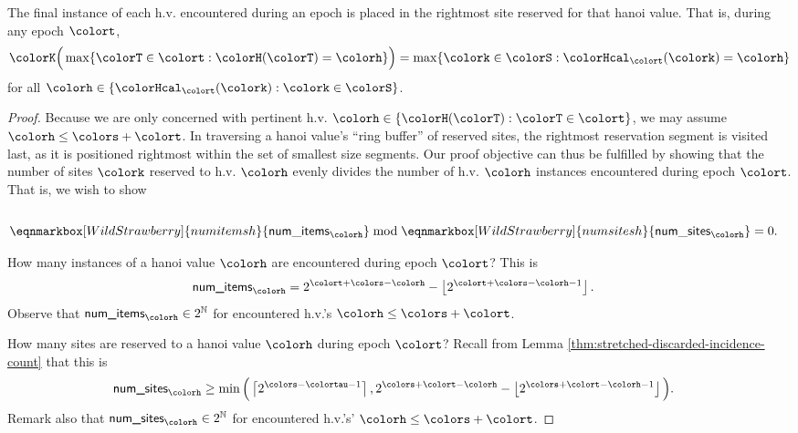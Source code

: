 \begin{lemma}
\label{thm:tilted-last-touched}
The final instance of each h.v. encountered during an epoch is placed in the rightmost site reserved for that hanoi value.
That is, during any epoch $\colort$,
\begin{align*}
\colorK\Big(
  \max\{\colorT \in \colort : \colorH(\colorT) = \colorh\}
\Big)
=
\max\{\colork \in \colorS : \colorHcal_{\colort}(\colork) = \colorh \}
\end{align*}
for all $\colorh \in \{\colorHcal_{\colort}(\colork) : \colork \in \colorS\}$.
\end{lemma}

\begin{proof}
Because we are only concerned with pertinent h.v. $\colorh \in \{\colorH(\colorT) : \colorT \in \colort\}$, we may assume $\colorh \leq \colors + \colort$.
In traversing a hanoi value's ``ring buffer'' of reserved sites, the rightmost reservation segment is visited last, as it is positioned rightmost within the set of smallest size segments.
Our proof objective can thus be fulfilled by showing that the number of sites $\colork$ reserved to h.v. $\colorh$ evenly divides the number of h.v. $\colorh$ instances encountered during epoch $\colort$.
That is, we wish to show
\begin{align*}
\\
\eqnmarkbox[WildStrawberry]{numitemsh}{
  \mathsf{num\_items}_{\colorh}
}
\bmod
\eqnmarkbox[WildStrawberry]{numsitesh}{
  \mathsf{num\_sites}_{\colorh}
}
&= 0.
\end{align*}


How many instances of a hanoi value $\colorh$ are encountered during epoch $\colort$?
This is
\begin{align*}
\textsf{num\_items}_{\colorh}
&=
2^{\colort + \colors - \colorh} - \left\lfloor2^{\colort + \colors - \colorh - 1} \right\rfloor.
\end{align*}
Observe that $\textsf{num\_items}_{\colorh} \in 2^{\mathbb{N}}$ for encountered h.v.'s $\colorh \leq \colors + \colort$.

How many sites are reserved to a hanoi value $\colorh$ during epoch $\colort$?
Recall from Lemma \ref{thm:stretched-discarded-incidence-count} that this is
\begin{align*}
\textsf{num\_sites}_{\colorh}
&\geq
\min\Big(
\left\lceil 2^{\colors - \colortau - 1} \right\rceil,
2^{\colors + \colort - \colorh} - \left\lfloor 2^{\colors + \colort - \colorh - 1} \right\rfloor
\Big).
\end{align*}
Remark also that $\textsf{num\_sites}_{\colorh} \in 2^{\mathbb{N}}$ for encountered h.v.'s' $\colorh \leq \colors + \colort$.


\end{proof}
